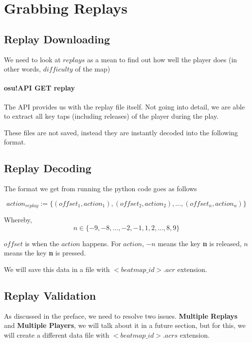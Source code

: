 

\section{Grabbing Replays}

\subsection{Replay Downloading}

We need to look at $replays$ as a mean to find out how well the player does (in other words, $difficulty$ of the map)

\paragraph{osu!API GET replay} The API provides us with the replay file itself. Not going into detail, we are able to extract all key taps (including releases) of the player during the play.

These files are not saved, instead they are instantly decoded into the following format.

\subsection{Replay Decoding}

The format we get from running the python code goes as follows

$$ action_{replay} := \lbrace(offset_1, action_1), (offset_2, action_2), ... , (offset_n, action_n)\rbrace $$

Whereby, 
$$n \in \lbrace-9, -8, ... , -2, -1, 1, 2, ... , 8, 9\rbrace$$

$offset$ is when the $action$ happens. For $action$, $-n$ means the key \textbf{n} is released, $n$ means the key \textbf{n} is pressed.

We will save this data in a file with $<beatmap\_id>.acr$ extension.

\subsection{Replay Validation}

As discussed in the preface, we need to resolve two issues. \textbf{Multiple Replays} and \textbf{Multiple Players}, we will talk about it in a future section, but for this, we will create a different data file with $<beatmap\_id>.acrs$ extension.


